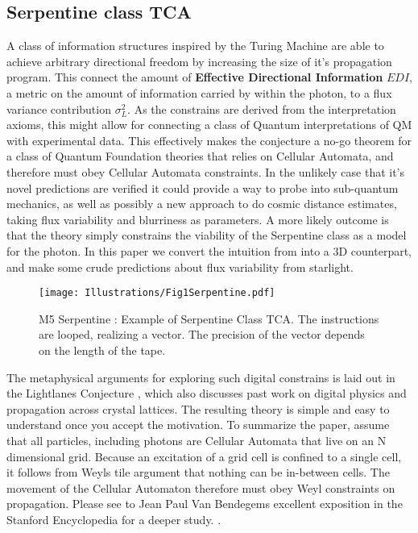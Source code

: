 \documentclass[notitlepage]{article}
\begin{document}
\subsection{Serpentine class TCA}
A class of information structures inspired by the Turing Machine are able to achieve arbitrary directional freedom by increasing the size of it's propagation program. This connect the amount of \textbf{Effective Directional Information} $EDI$, a metric on the amount of information carried by within the photon, to a flux variance contribution $\sigma_L^2$. As the constrains are derived from the interpretation axioms, this might allow for connecting a class of Quantum interpretations of QM with experimental data. This effectively makes the conjecture a no-go theorem for a class of Quantum Foundation theories that relies on Cellular Automata, and therefore must obey Cellular Automata constraints. In the unlikely case that it's novel predictions are verified it could provide a way to probe into sub-quantum mechanics, as well as possibly a new approach to do cosmic distance estimates, taking flux variability and blurriness as parameters. A more likely outcome is that the theory simply constrains the viability of the Serpentine class as a model for the photon. In this paper we convert the intuition from \citep{RhadamantysA2} into a 3D counterpart, and make some crude predictions about flux variability from starlight.

\begin{figure}[!ht]
  \centering
 \texttt{[image: Illustrations/Fig1Serpentine.pdf]}
  \caption{M5 Serpentine : Example of Serpentine Class TCA. The instructions are looped, realizing a vector. The precision of the vector depends on the length of the tape.}
      \label{fig:serpentine}
\end{figure}

The metaphysical arguments for exploring such digital constrains is laid out in the Lightlanes Conjecture \cite{RhadamantysA2}, which also discusses past work on digital physics and propagation across crystal lattices. The resulting theory is simple and easy to understand once you accept the motivation. To summarize the paper, assume that all particles, including photons are Cellular Automata that live on an N dimensional grid. Because an excitation of a grid cell is confined to a single cell, it follows from Weyls tile argument that nothing can be in-between cells. The movement of the Cellular Automaton therefore must obey Weyl constraints on propagation. Please see  to Jean Paul Van Bendegems excellent exposition in the Stanford Encyclopedia for a deeper study.  \cite{stanford-geometry-finitism}. 
\end{document}

